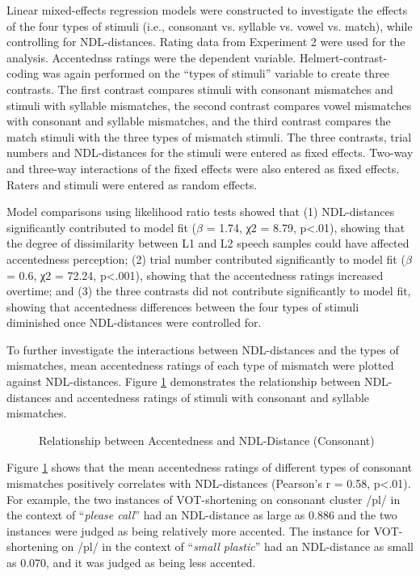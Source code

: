 Linear mixed-effects regression models were constructed to investigate the effects of the four types of stimuli (i.e., consonant vs. syllable vs. vowel vs. match), while controlling for NDL-distances. Rating data from Experiment 2 were used for the analysis. Accentednss ratings were the dependent variable. Helmert-contrast-coding was again performed on the “types of stimuli” variable to create three contrasts. The first contrast compares stimuli with consonant mismatches and stimuli with syllable mismatches, the second contrast compares vowel mismatches with consonant and syllable mismatches, and the third contrast compares the match stimuli with the three types of mismatch stimuli. The three contrasts, trial numbers and NDL-distances for the stimuli were entered as fixed effects. Two-way and three-way interactions of the fixed effects were also entered as fixed effects. Raters and stimuli were entered as random effects.

Model comparisons using likelihood ratio tests showed that (1) NDL-distances significantly contributed to model fit ($\beta$ = 1.74, χ2 = 8.79, p<.01), showing that the degree of dissimilarity between L1 and L2 speech samples could have affected accentedness perception; (2) trial number contributed significantly to model fit ($\beta$ = 0.6, χ2 = 72.24, p<.001), showing that the accentedness ratings increased overtime; and (3) the three contrasts did not contribute significantly to model fit, showing that accentedness differences between the four types of stimuli diminished once NDL-distances were controlled for.

To further investigate the interactions between NDL-distances and the types of mismatches, mean accentedness ratings of each type of mismatch were plotted against NDL-distances. Figure \ref{fig:con} demonstrates the relationship between NDL-distances and accentedness ratings of stimuli with consonant and syllable mismatches.

\begin{figure}[!h]
  \figSpace
    \centering
    
    \caption{Relationship between Accentedness and NDL-Distance (Consonant)}
    \label{fig:con}
  \figSpace
\end{figure}

Figure \ref{fig:con} shows that the mean accentedness ratings of different types of consonant mismatches positively correlates with NDL-distances (Pearson’s r = 0.58, p<.01). For example, the two instances of VOT-shortening on consonant cluster /pl/ in the context of “\textit{please call}” had an NDL-distance as large as 0.886 and the two instances were judged as being relatively more accented. The instance for VOT-shortening on /pl/ in the context of “\textit{small plastic}” had an NDL-distance as small as 0.070, and it was judged as being less accented. 


